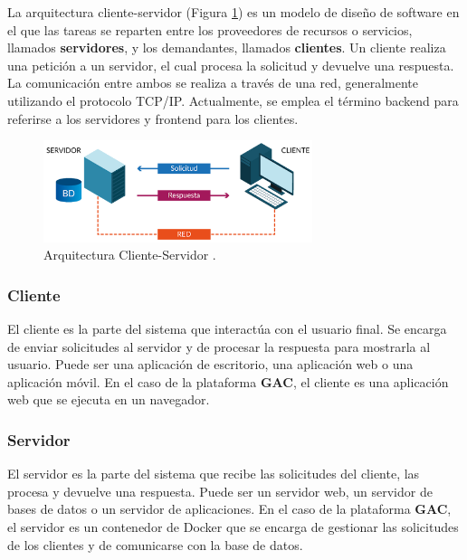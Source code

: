 La arquitectura cliente-servidor (Figura \ref{fig:cliente_servidor}) es un modelo de diseño de software en el que las tareas se reparten entre los proveedores de recursos o servicios, llamados \textbf{servidores}, y los demandantes, llamados \textbf{clientes}. Un cliente realiza una petición a un servidor, el cual procesa la solicitud y devuelve una respuesta. La comunicación entre ambos se realiza a través de una red, generalmente utilizando el protocolo TCP/IP. Actualmente, se emplea el término backend para referirse a los servidores y frontend para los clientes.\newline

\begin{figure}[H]
    \centering
    \includegraphics[width=0.7\textwidth]{./imagenes/cliente_servidor.png}
    \caption{Arquitectura Cliente-Servidor \cite{sucerman2023}.}
    \label{fig:cliente_servidor}
\end{figure}

\subsubsection*{Cliente}

El cliente es la parte del sistema que interactúa con el usuario final. Se encarga de enviar solicitudes al servidor y de procesar la respuesta para mostrarla al usuario. Puede ser una aplicación de escritorio, una aplicación web o una aplicación móvil. En el caso de la plataforma \textbf{GAC}, el cliente es una aplicación web que se ejecuta en un navegador.\newline

\subsubsection*{Servidor}

El servidor es la parte del sistema que recibe las solicitudes del cliente, las procesa y devuelve una respuesta. Puede ser un servidor web, un servidor de bases de datos o un servidor de aplicaciones. En el caso de la plataforma \textbf{GAC}, el servidor es un contenedor de Docker que se encarga de gestionar las solicitudes de los clientes y de comunicarse con la base de datos.

